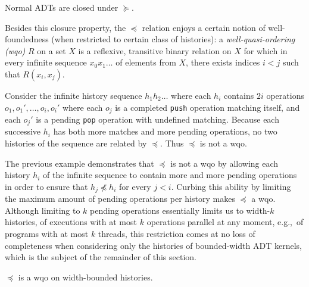 \begin{lemma}

  Normal ADTs are closed under $\succeq$.

\end{lemma}

Besides this closure property, the $\preceq$ relation enjoys a certain notion
of well-foundedness (when restricted to certain class of histories): a
\emph{well-quasi-ordering (wqo)} $R$ on a set $X$ is a reflexive, transitive
binary relation on $X$ for which in every infinite sequence $x_0 x_1 \ldots$ of
elements from $X$, there exists indices $i < j$ such that $R(x_i,x_j)$.

\begin{example}

  Consider the infinite history sequence $h_1 h_2 \ldots$ where each $h_i$
  contains $2i$ operations $o_1, o_1', \ldots, o_i, o_i'$ where each $o_j$ is a
  completed {\tt push} operation matching itself, and each $o_j'$ is a pending
  {\tt pop} operation with undefined matching. Because each successive $h_i$
  has both more matches and more pending operations, no two histories of the
  sequence are related by $\preceq$. Thus $\preceq$ is not a wqo.

\end{example}

The previous example demonstrates that $\preceq$ is not a wqo by allowing each
history $h_i$ of the infinite sequence to contain more and more pending
operations in order to ensure that $h_j \not\preceq h_i$ for every $j < i$.
Curbing this ability by limiting the maximum amount of pending operations per
history makes $\preceq$ a wqo. Although limiting to $k$ pending operations
essentially limits us to width-$k$ histories, of executions with at most $k$
operations parallel at any moment, e.g.,~of programs with at most $k$ threads,
this restriction comes at no loss of completeness when considering only the
histories of bounded-width ADT kernels, which is the subject of the remainder
of this section.

\begin{lemma}

  $\preceq$ is a wqo on width-bounded histories.

\end{lemma}

